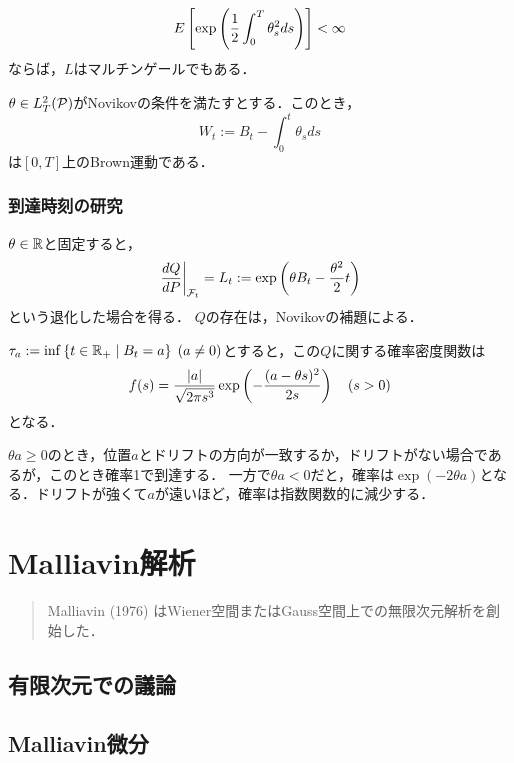 \documentclass[uplatex,dvipdfmx]{jsreport}
\begin{document}
\begin{lemma}[Novikov (1972)]
    \[E\Square{\exp\paren{\frac{1}{2}\int^T_0\theta^2_sds}}<\infty\]
    ならば，$L$はマルチンゲールでもある．
\end{lemma}

\begin{theorem}
    $\theta\in L^2_T(\P)$がNovikovの条件を満たすとする．このとき，
    \[W_t:=B_t-\int^t_0\theta_sds\]
    は$[0,T]$上のBrown運動である．
\end{theorem}

\subsection{到達時刻の研究}

\begin{notation}
    $\theta\in\R$と固定すると，
    \[\left.\frac{dQ}{dP}\right|_{\F_t}=L_t:=\exp\paren{\theta B_t-\frac{\theta^2}{2}t}\]
    という退化した場合を得る．
    $Q$の存在は，Novikovの補題による．
\end{notation}

\begin{proposition}
    $\tau_a:=\inf\Brace{t\in\R_+\mid B_t=a}\;(a\ne0)$とすると，この$Q$に関する確率密度関数は
    \[f(s)=\frac{\abs{a}}{\sqrt{2\pi s^3}}\exp\paren{-\frac{(a-\theta s)^2}{2s}}\quad(s>0)\]
    となる．
\end{proposition}
\begin{remarks}
    $\theta a\ge0$のとき，位置$a$とドリフトの方向が一致するか，ドリフトがない場合であるが，このとき確率1で到達する．
    一方で$\theta a<0$だと，確率は$\exp(-2\theta a)$となる．ドリフトが強くて$a$が遠いほど，確率は指数関数的に減少する．
\end{remarks}

\chapter{Malliavin解析}

\begin{quotation}
    Malliavin (1976) はWiener空間またはGauss空間上での無限次元解析を創始した．
\end{quotation}

\section{有限次元での議論}

\section{Malliavin微分}
\end{document}
